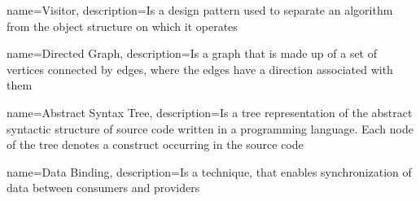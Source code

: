



{
    name={Visitor},
    description={Is a design pattern used to separate an algorithm from the object structure on which it operates}
}

{
    name={Directed Graph},
    description={Is a graph that is made up of a set of vertices connected by edges, where the edges have a direction associated with them}
}


{
    name={Abstract Syntax Tree},
    description={Is a tree representation of the abstract syntactic structure of source code written in a programming language. Each node of the tree denotes a construct occurring in the source code}
}


{
    name={Data Binding},
    description={Is a technique, that enables synchronization of data between consumers and providers}
}












\glsaddall